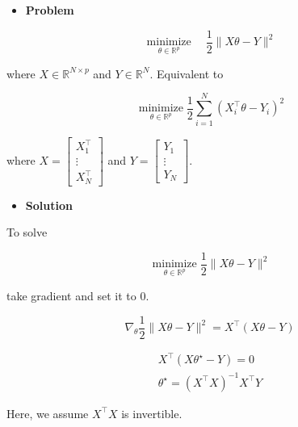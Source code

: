 \documentclass{report}
\begin{document}
\begin{example}
    \begin{itemize}
        \item \textbf{Problem}
    \end{itemize}

    $$
    \underset{\theta \in \mathbb{R}^{p}}{\operatorname{minimize}} \quad \frac{1}{2}\|X \theta-Y\|^{2}
    $$

    where $X \in \mathbb{R}^{N \times p}$ and $Y \in \mathbb{R}^{N}$. Equivalent to

    $$
    \underset{\theta \in \mathbb{R}^{p}}{\operatorname{minimize}} \frac{1}{2} \sum_{i=1}^{N}\left(X_{i}^{\top} \theta-Y_{i}\right)^{2}
    $$

    where $X=\left[\begin{array}{c}X_{1}^{\top} \\ \vdots \\ X_{N}^{\top}\end{array}\right]$ and $Y=\left[\begin{array}{c}Y_{1} \\ \vdots \\ Y_{N}\end{array}\right]$.

    \par\noindent\textcolor{gray}{\hdashrule{\textwidth}{0.4pt}{1pt 2pt}}

    \begin{itemize}
        \item \textbf{Solution}
    \end{itemize}

    To solve

    $$
    \underset{\theta \in \mathbb{R}^{p}}{\operatorname{minimize}} \frac{1}{2}\|X \theta-Y\|^{2}
    $$

    take gradient and set it to $0$.

    $$
    \nabla_{\theta} \frac{1}{2}\|X \theta-Y\|^{2}=X^{\top}(X \theta-Y)
    $$

    $$
    \begin{gathered}
    X^{\top}\left(X \theta^{\star}-Y\right)=0 \\
    \theta^{\star}=\left(X^{\top} X\right)^{-1} X^{\top} Y
    \end{gathered}
    $$

    Here, we assume $X^{\top} X$ is invertible.
\end{example}
\end{document}
